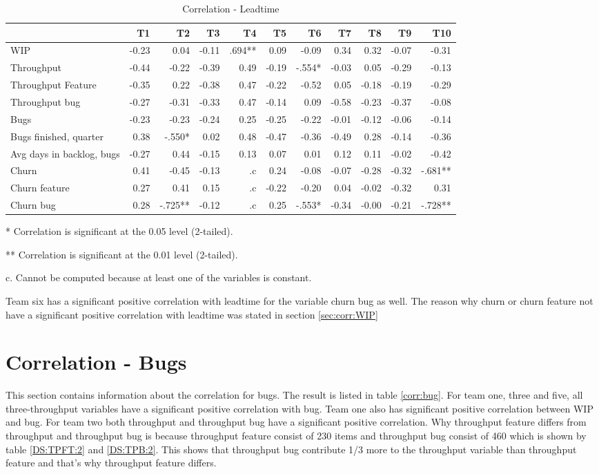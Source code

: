 \documentclass[UKenglish]{ifimaster}  %
\begin{document}
\begin{table}[!htbp]
 \centering
 \begin{tabular}{|l|r|r|r|r|r|r|r|r|r|r|}
\hline
  & T1 & T2 & T3 & T4 & T5 & T6 & T7 & T8 & T9 & T10\\ \hline
WIP &-0.23& 0.04& -0.11& .694**& 0.09& -0.09& 0.34& 0.32& -0.07& -0.31\\ \hline
Throughput &-0.44& -0.22& -0.39& 0.49& -0.19& -.554*& -0.03& 0.05& -0.29& -0.13\\ \hline
Throughput Feature &-0.35& 0.22& -0.38& 0.47& -0.22& -0.52& 0.05& -0.18& -0.19& -0.29\\ \hline
Throughput bug &-0.27& -0.31& -0.33& 0.47& -0.14& 0.09& -0.58& -0.23& -0.37& -0.08\\ \hline
Bugs &-0.23& -0.23& -0.24& 0.25& -0.25& -0.22& -0.01& -0.12& -0.06& -0.14\\ \hline
Bugs finished, quarter &0.38& -.550*& 0.02& 0.48& -0.47& -0.36& -0.49& 0.28& -0.14& -0.36\\ \hline
Avg days in backlog, bugs &-0.27& 0.44& -0.15& 0.13& 0.07& 0.01& 0.12& 0.11& -0.02& -0.42\\ \hline
Churn &0.41& -0.45& -0.13& .c& 0.24& -0.08& -0.07& -0.28& -0.32& -.681**\\ \hline
Churn feature &0.27& 0.41& 0.15& .c& -0.22& -0.20& 0.04& -0.02& -0.32& 0.31\\ \hline
Churn bug &0.28& -.725**
& -0.12& .c
& 0.25& -.553*
& -0.34& -0.00& -0.21& -.728**
\\ \hline
\end{tabular}
 \caption{Correlation - Leadtime}
 \label{corr:Leadtime}
 \centerline {* Correlation is significant at the 0.05 level (2-tailed).}
\centerline{** Correlation is significant at the 0.01 level (2-tailed).}
\centerline{c. Cannot be computed because at least one of the variables is constant.}
\end{table}
Team six has a significant positive correlation with leadtime for the variable churn bug as well. The reason why churn or churn feature not have a significant positive correlation with leadtime was stated in section \ref{sec:corr:WIP}
\section{Correlation - Bugs}
\label{sec:corr:bug}

This section contains information about the correlation for bugs. The result is listed in table \ref{corr:bug}. For team one, three and five, all three-throughput variables have a significant positive correlation with bug. Team one also has significant positive correlation between WIP and bug. For team two both throughput and throughput bug have a significant positive correlation. 
Why throughput feature differs from throughput and throughput bug is because throughput feature consist of 230 items and throughput bug consist of 460 which is shown by table \ref{DS:TPFT:2} and \ref{DS:TPB:2}. This shows that throughput bug contribute 1/3 more to the throughput variable than throughput feature and that's why throughput feature differs. 
\end{document}
